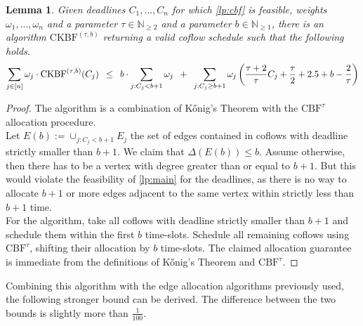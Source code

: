 \documentclass[11pt]{article}
\newcommand{\Hquad}{\hspace{0.5em}}
\newtheorem{lemma}[theorem]{Lemma}
\begin{document}
\begin{lemma}\label{label:app:koenigcbf}
Given deadlines $C_1,\dotsc,C_n$ for which \ref{lp:cbf} is feasible, weights $\omega_1,...,\omega_n$ and a parameter $\tau \in \mathbb{N}_{\ge 2}$ and a parameter $b \in \mathbb{N}_{\ge 1}$, there is an algorithm $\mathrm{CKBF}^{(\tau,b)}$ returning a valid coflow schedule such that the following holds.
\begin{equation*}
    \sum_{j \in [n]}\omega_j \cdot\mathrm{CKBF}^{(\tau,b)}(C_j) \Hquad\le\Hquad b \cdot \sum_{j: C_j < b+1} \omega_j \Hquad + \Hquad \sum_{j: C_j \ge b+1}\omega_j\left(\frac{\tau+2}{\tau}C_j + \frac{\tau}{2} + 2.5 + b - \frac{2}{\tau}\right)
\end{equation*}
\end{lemma}
\begin{proof}

The algorithm is a combination of Kőnig's Theorem with the $\mathrm{CBF}^\tau$ allocation procedure.\\
Let $E(b) := \cup_{j:C_j < b+1}E_j$ the set of edges contained in coflows with deadline strictly smaller than $b+1$. We claim that $\Delta(E(b)) \le b$. Assume otherwise, then there has to be a vertex with degree greater than or equal to $b+1$. But this would violate the feasibility of \ref{lp:main} for the deadlines, as there is no way to allocate $b+1$ or more edges adjacent to the same vertex within strictly less than $b+1$ time.\\
For the algorithm, take all coflows with deadline strictly smaller than $b+1$ and schedule them within the first $b$ time-slots. Schedule all remaining coflows using $\mathrm{CBF}^\tau$, shifting their allocation by $b$ time-slots. The claimed allocation guarantee is immediate from the definitions of Kőnig's Theorem and $\mathrm{CBF}^\tau$.
\end{proof}

Combining this algorithm with the edge allocation algorithms previously used, the following stronger bound can be derived. The difference between the two bounds is slightly more than $\frac{1}{100}$.
\end{document}
